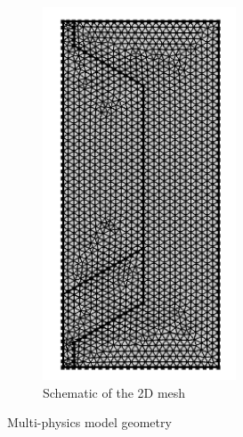 \documentclass{elsarticle}
\begin{document}
\begin{figure}[h]
\begin{subfigure}{0.35\textwidth}
    \includegraphics[width = \columnwidth]{./images/diffusion/mesh.png}
    \caption{Schematic of the 2D mesh}
  \end{subfigure}
  \caption{Multi-physics model geometry}
  \label{fig:model_geom}
\end{figure}
\end{document}
